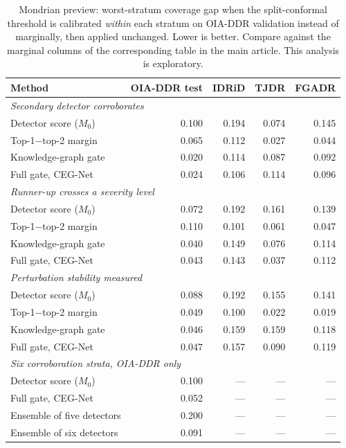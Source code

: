 \begin{table}[htbp]
\centering
\caption{Mondrian preview: worst-stratum coverage gap when the split-conformal threshold is calibrated \emph{within} each stratum on OIA-DDR validation instead of marginally, then applied unchanged. Lower is better. Compare against the marginal columns of the corresponding table in the main article. This analysis is exploratory.}
\label{tab:mondrian_preview}
\footnotesize
\setlength{\tabcolsep}{5pt}
\begin{tabular}{lrrrr}
\toprule
Method & OIA-DDR test & IDRiD & TJDR & FGADR \\
\midrule
\multicolumn{5}{l}{\textit{Secondary detector corroborates}} \\
Detector score ($M_0$) & 0.100 & 0.194 & 0.074 & 0.145 \\
Top-1$-$top-2 margin & 0.065 & 0.112 & 0.027 & 0.044 \\
Knowledge-graph gate & 0.020 & 0.114 & 0.087 & 0.092 \\
Full gate, CEG-Net & 0.024 & 0.106 & 0.114 & 0.096 \\
\midrule
\multicolumn{5}{l}{\textit{Runner-up crosses a severity level}} \\
Detector score ($M_0$) & 0.072 & 0.192 & 0.161 & 0.139 \\
Top-1$-$top-2 margin & 0.110 & 0.101 & 0.061 & 0.047 \\
Knowledge-graph gate & 0.040 & 0.149 & 0.076 & 0.114 \\
Full gate, CEG-Net & 0.043 & 0.143 & 0.037 & 0.112 \\
\midrule
\multicolumn{5}{l}{\textit{Perturbation stability measured}} \\
Detector score ($M_0$) & 0.088 & 0.192 & 0.155 & 0.141 \\
Top-1$-$top-2 margin & 0.049 & 0.100 & 0.022 & 0.019 \\
Knowledge-graph gate & 0.046 & 0.159 & 0.159 & 0.118 \\
Full gate, CEG-Net & 0.047 & 0.157 & 0.090 & 0.119 \\
\midrule
\multicolumn{5}{l}{\textit{Six corroboration strata, OIA-DDR only}} \\
Detector score ($M_0$) & 0.100 & --- & --- & --- \\
Full gate, CEG-Net & 0.052 & --- & --- & --- \\
Ensemble of five detectors & 0.200 & --- & --- & --- \\
Ensemble of six detectors & 0.091 & --- & --- & --- \\
\bottomrule
\end{tabular}
\end{table}
